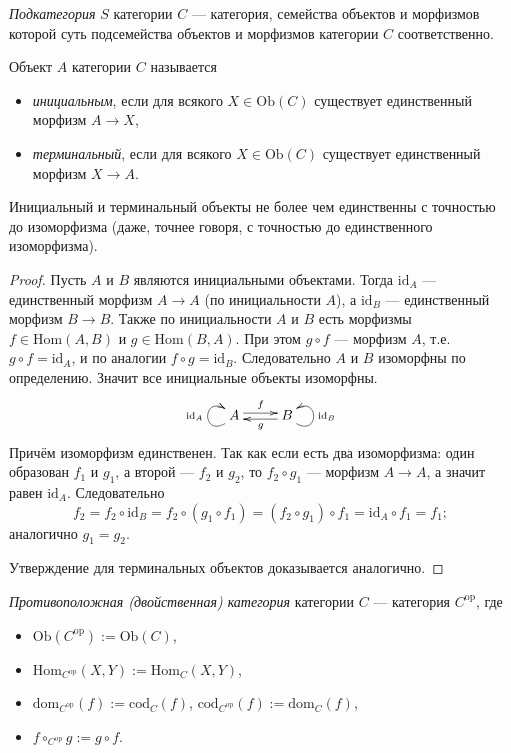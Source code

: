 \documentclass[12pt,a4paper]{article}
\newcommand{\op}{\mathrm{op}}
\newcommand{\Hom}{\mathrm{Hom}}
\newcommand{\dom}{\mathrm{dom}}
\newcommand{\cod}{\mathrm{cod}}
\newcommand{\Ob}{\mathrm{Ob}}
\newcommand{\id}{\mathrm{id}}
\begin{document}
    \begin{definition}
        \emph{Подкатегория} $S$ категории $C$ --- категория, семейства объектов и морфизмов которой суть подсемейства объектов и морфизмов категории $C$ соответственно.
    \end{definition}

    \begin{definition}
        Объект $A$ категории $C$ называется
        \begin{itemize}
            \item \emph{инициальным}, если для всякого $X \in \Ob(C)$ существует единственный морфизм $A \to X$,
            \item \emph{терминальный}, если для всякого $X \in \Ob(C)$ существует единственный морфизм $X \to A$.
        \end{itemize}
    \end{definition}

    \begin{lemma}
        Инициальный и терминальный объекты не более чем единственны с точностью до изоморфизма (даже, точнее говоря, с точностью до единственного изоморфизма).
    \end{lemma}

    \begin{proof}
        Пусть $A$ и $B$ являются инициальными объектами. Тогда $\id_A$ --- единственный морфизм $A \to A$ (по инициальности $A$), а $\id_B$ --- единственный морфизм $B \to B$. Также по инициальности $A$ и $B$ есть морфизмы $f \in \Hom(A, B)$ и $g \in \Hom(B, A)$. При этом $g \circ f$ --- морфизм $A$, т.е. $g \circ f = \id_A$, и по аналогии $f \circ g = \id_B$. Следовательно $A$ и $B$ изоморфны по определению. Значит все инициальные объекты изоморфны.
        \[
            \xymatrix{
                A \ar@(dl,ul)[]^{\id_A} \ar@<0.5ex>[r]^{f} & B \ar@(dr,ur)[]_{\id_B} \ar@<0.5ex>[l]^{g}
            }
        \]
        Причём изоморфизм единственен. Так как если есть два изоморфизма: один образован $f_1$ и $g_1$, а второй --- $f_2$ и $g_2$, то $f_2 \circ g_1$ --- морфизм $A \to A$, а значит равен $\id_A$. Следовательно
        \[f_2 = f_2 \circ \id_B = f_2 \circ (g_1 \circ f_1) = (f_2 \circ g_1) \circ f_1 = \id_A \circ f_1 = f_1;\]
        аналогично $g_1 = g_2$.

        Утверждение для терминальных объектов доказывается аналогично.
    \end{proof}

    \begin{definition}
        \emph{Противоположная (двойственная) категория} категории $C$ --- категория $C^\op$, где
        \begin{itemize}
            \item $\Ob(C^\op) := \Ob(C)$,
            \item $\Hom_{C^\op}(X, Y) := \Hom_C(X, Y)$,
            \item $\dom_{C^\op}(f) := \cod_C(f)$, $\cod_{C^\op}(f) := \dom_C(f)$,
            \item $f \circ_{C^\op} g := g \circ f$.
        \end{itemize}
    \end{definition}
\end{document}
